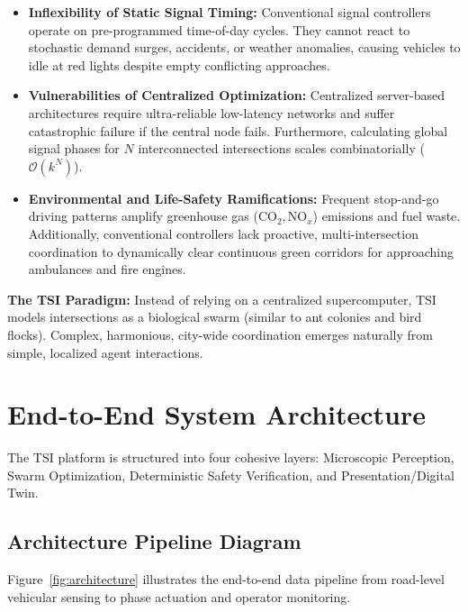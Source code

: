 \documentclass[11pt,a4paper]{article}
\begin{document}
\begin{itemize}
    \item \textbf{Inflexibility of Static Signal Timing:} Conventional signal controllers operate on pre-programmed time-of-day cycles. They cannot react to stochastic demand surges, accidents, or weather anomalies, causing vehicles to idle at red lights despite empty conflicting approaches.
    \item \textbf{Vulnerabilities of Centralized Optimization:} Centralized server-based architectures require ultra-reliable low-latency networks and suffer catastrophic failure if the central node fails. Furthermore, calculating global signal phases for $N$ interconnected intersections scales combinatorially ($\mathcal{O}(k^N)$).
    \item \textbf{Environmental and Life-Safety Ramifications:} Frequent stop-and-go driving patterns amplify greenhouse gas ($\text{CO}_2, \text{NO}_x$) emissions and fuel waste. Additionally, conventional controllers lack proactive, multi-intersection coordination to dynamically clear continuous green corridors for approaching ambulances and fire engines.
\end{itemize}

\textbf{The TSI Paradigm:} Instead of relying on a centralized supercomputer, TSI models intersections as a biological swarm (similar to ant colonies and bird flocks). Complex, harmonious, city-wide coordination emerges naturally from simple, localized agent interactions.

\section{End-to-End System Architecture}

The TSI platform is structured into four cohesive layers: Microscopic Perception, Swarm Optimization, Deterministic Safety Verification, and Presentation/Digital Twin.

\subsection{Architecture Pipeline Diagram}

Figure~\ref{fig:architecture} illustrates the end-to-end data pipeline from road-level vehicular sensing to phase actuation and operator monitoring.
\end{document}
